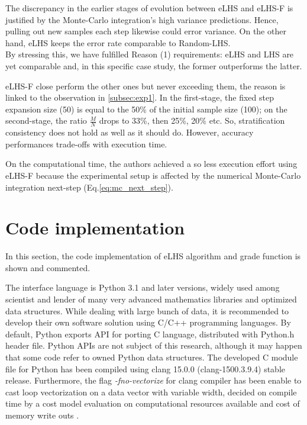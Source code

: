 \documentclass[12pt]{extarticle}
\newcommand{\meqref}[1]{Eq.\ref{#1}}
\begin{document}
The discrepancy in the earlier stages of evolution between eLHS and eLHS-F is justified by the Monte-Carlo integration's high variance predictions. Hence, pulling out new samples each step likewise could error variance. On the other hand, eLHS keeps the error rate comparable to Random-LHS.\\
By stressing this, we have fulfilled Reason (1) requirements: eLHS and LHS are yet comparable and, in this specific case study, the former outperforms the latter.

eLHS-F close perform the other ones but never exceeding them, the reason is linked to the observation in \cref{subsec:exp1}. In the first-stage, the fixed step expansion size (50) is equal to the 50\% of the initial sample size (100); on the second-stage, the ratio $\frac{M}{N}$ drops to 33\%, then 25\%, 20\% etc. So, stratification consistency does not hold as well as it should do. However, accuracy performances trade-offs with execution time.

On the computational time, the authors achieved a so less execution effort using eLHS-F because the experimental setup is affected by the numerical Monte-Carlo integration next-step (\meqref{eq:mc_next_step}).


\section{Code implementation}
\label{sec:code_implementation}
In this section, the code implementation of eLHS algorithm and grade function is shown and commented. 

The interface language is Python 3.1 and later versions, widely used among scientist and lender of many very advanced mathematics libraries and optimized data structures. While dealing with large bunch of data, it is recommended to develop their own software solution using C/C++ programming languages. By default, Python exports API for porting C language, distributed with Python.h header file. Python APIs are not subject of this research, although it may happen that some code refer to owned Python data structures. The developed C module file for Python has been compiled using clang 15.0.0 (clang-1500.3.9.4) stable release. Furthermore, the flag \emph{-fno-vectorize} for clang compiler has been enable to cast loop vectorization on a data vector with variable width, decided on compile time by a cost model evaluation on computational resources available and cost of memory write outs .
\end{document}
